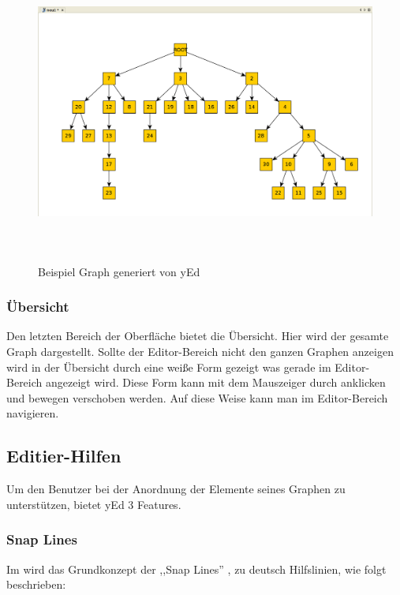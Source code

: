 \begin{figure}[H]
	\begin{center}
		\includegraphics[width=13cm,height=10cm]{images/yed_editor.png}
		\caption{Beispiel Graph generiert von yEd}
		\label{yEdEditor}
	\end{center}
\end{figure}

\subsubsection{Übersicht}

Den letzten Bereich der Oberfläche bietet die Übersicht. Hier wird der gesamte Graph dargestellt. Sollte der Editor-Bereich nicht den ganzen Graphen anzeigen wird in der Übersicht durch eine weiße Form gezeigt was gerade im Editor-Bereich angezeigt wird. Diese Form kann mit dem Mauszeiger durch anklicken und bewegen verschoben werden. Auf diese Weise kann man im Editor-Bereich navigieren.


\subsection{Editier-Hilfen}

Um den Benutzer bei der Anordnung der Elemente seines Graphen zu unterstützen, bietet yEd 3 Features.

\subsubsection{Snap Lines}
\prc
Im  wird das Grundkonzept der ,,Snap Lines'' , zu deutsch Hilfslinien, wie folgt beschrieben:


